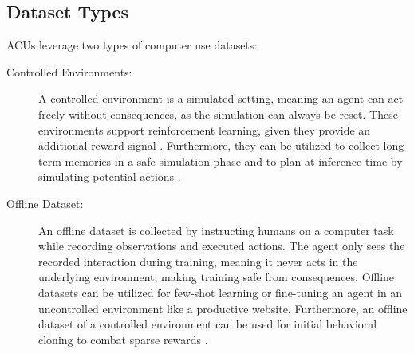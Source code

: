 \subsection{Dataset Types}

ACUs leverage two types of computer use datasets:
%

\begin{description}
    \item[Controlled Environments:] 
    A controlled environment is a simulated setting, meaning an agent can act freely without consequences, as the simulation can always be reset.
    These environments support reinforcement learning, given they provide an additional reward signal  .
    Furthermore, they can be utilized to collect long-term memories in a safe simulation phase  and to plan at inference time by simulating potential actions \citep{koh_tree_2024}.
    \item[Offline Dataset: ]
    An offline dataset is collected by instructing humans on a computer task while recording observations and executed actions.
    The agent only sees the recorded interaction during training, meaning it never acts in the underlying environment, making training safe from consequences.
    Offline datasets can be utilized for few-shot learning  or fine-tuning an agent  in an uncontrolled environment like a productive website. Furthermore, an offline dataset of a controlled environment can be used for initial behavioral cloning to combat sparse rewards \citep{humphreys_data-driven_2022}.
\end{description}


